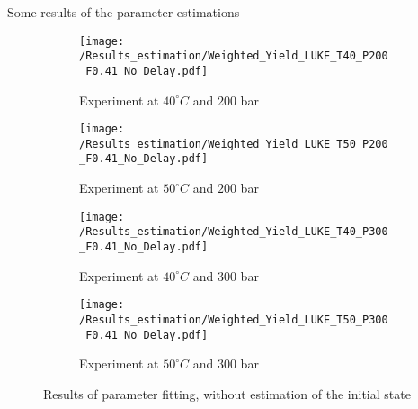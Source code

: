 \documentclass[../Article_Model_Parameters.tex]{subfiles}
\begin{document}
	
	\label{CH: Results}
	
	Some results of the parameter estimations

	\begin{figure*}
		\centering
		\begin{subfigure}[b]{0.7\textwidth}
			\centering
			\texttt{[image: /Results\_estimation/Weighted\_Yield\_LUKE\_T40\_P200\_F0.41\_No\_Delay.pdf]}
			\caption{Experiment at $40^\circ C$ and $200$ bar}
		\end{subfigure}
		\hfill
		\begin{subfigure}[b]{0.7\textwidth}
			\centering
			\texttt{[image: /Results\_estimation/Weighted\_Yield\_LUKE\_T50\_P200\_F0.41\_No\_Delay.pdf]}
			\caption{Experiment at $50^\circ C$ and $200$ bar}
		\end{subfigure}
		\hfill
		\begin{subfigure}[b]{0.7\textwidth}
			\centering
			\texttt{[image: /Results\_estimation/Weighted\_Yield\_LUKE\_T40\_P300\_F0.41\_No\_Delay.pdf]}
			\caption{Experiment at $40^\circ C$ and $300$ bar}
		\end{subfigure}
		\hfill
		\begin{subfigure}[b]{0.7\textwidth}
			\centering
			\texttt{[image: /Results\_estimation/Weighted\_Yield\_LUKE\_T50\_P300\_F0.41\_No\_Delay.pdf]}
			\caption{Experiment at $50^\circ C$ and $300$ bar}
		\end{subfigure}
		\caption{Results of parameter fitting, without estimation of the initial state}
	\end{figure*}
\end{document}
